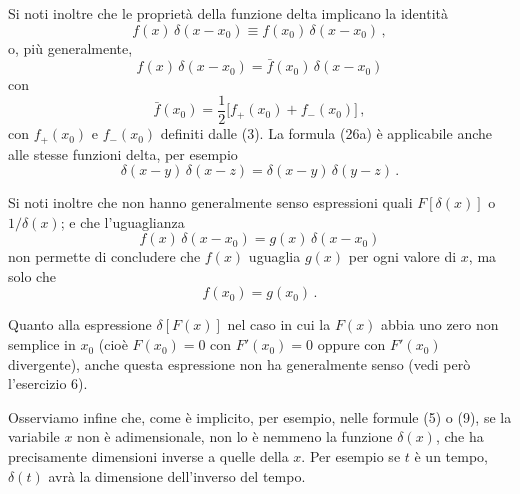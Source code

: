 \documentclass[11pt, a4paper]{book}
\numberwithin{equation}{section}
\begin{document}
Si noti inoltre che le proprietà della funzione delta implicano la identità
\begin{equation}
f(x)\,\delta(x - x_0) \equiv f(x_0)\,\delta(x - x_0) \,, \tag{26a}
\end{equation}
o, più generalmente,
\begin{equation}
f(x)\,\delta(x - x_0) = \bar{f}(x_0)\,\delta(x - x_0) \tag{26b}
\end{equation}
con
\begin{equation}
\bar{f}(x_0) = \frac{1}{2}\bigl[f_+(x_0) + f_-(x_0)\bigr] \,, \tag{27}
\end{equation}
con $f_+(x_0)$ e $f_-(x_0)$ definiti dalle (3). La formula (26a) è applicabile anche alle stesse funzioni delta, per esempio
\begin{equation}
\delta(x - y)\,\delta(x - z) = \delta(x - y)\,\delta(y - z) \,. \tag{28}
\end{equation}

Si noti inoltre che non hanno generalmente senso espressioni quali $F[\delta(x)]$ o $1/\delta(x)$; e che l'uguaglianza
\begin{equation}
f(x)\,\delta(x - x_0) = g(x)\,\delta(x - x_0) \tag{29}
\end{equation}
non permette di concludere che $f(x)$ uguaglia $g(x)$ per ogni valore di $x$, ma solo che
\begin{equation}
f(x_0) = g(x_0) \,. \tag{30}
\end{equation}

Quanto alla espressione $\delta[F(x)]$ nel caso in cui la $F(x)$ abbia uno zero non semplice in $x_0$ (cioè $F(x_0) = 0$ con $F'(x_0) = 0$ oppure con $F'(x_0)$ divergente), anche questa espressione non ha generalmente senso (vedi però l'esercizio 6).

Osserviamo infine che, come è implicito, per esempio, nelle formule (5) o (9), se la variabile $x$ non è adimensionale, non lo è nemmeno la funzione $\delta(x)$, che ha precisamente dimensioni inverse a quelle della $x$. Per esempio se $t$ è un tempo, $\delta(t)$ avrà la dimensione dell'inverso del tempo.
\end{document}
